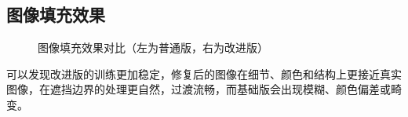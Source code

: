 \documentclass[12pt, a4paper, oneside]{ctexart}
\numberwithin{equation}{section}  %
\begin{document}
\subsection{图像填充效果}
\begin{figure}[H]
  \centering
  \setlength{\abovecaptionskip}{0ex}  %
  \label{fig-1}
  \caption{图像填充效果对比（左为普通版，右为改进版）}
\end{figure}
可以发现改进版的训练更加稳定，修复后的图像在细节、颜色和结构上更接近真实图像，在遮挡边界的处理更自然，过渡流畅，而基础版会出现模糊、颜色偏差或畸变。
\end{document}
